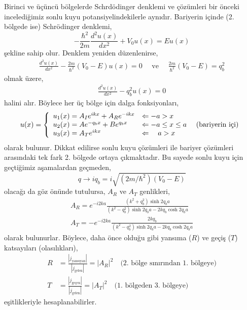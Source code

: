 \documentclass[a4paper,12pt, twoside]{article}
\begin{document}
Birinci ve üçüncü bölgelerde Schrdödinger denklemi ve çözümleri bir önceki incelediğimiz sonlu kuyu potansiyelindekilerle aynıdır. Bariyerin içinde (2. bölgede ise) Schrödinger denklemi, 
\begin{equation}
- \frac { \hbar ^ { 2 } } { 2 m } \frac { d ^ { 2 } u ( x ) } { d x ^ { 2 } } + V_0 u ( x ) = E u ( x )
\end{equation}
şekline sahip olur. Denklem yeniden düzenlenirse, 
\begin{align}
\frac { d ^ { 2 } u ( x ) } { d x ^ { 2 } } -  \frac { 2 m} { \hbar ^ { 2 } }  \left(V _ { 0 }-E \right) u ( x ) = 0 \quad \text{ ve } \quad \frac { 2 m} { \hbar ^ { 2 } }  \left(V _ { 0 } - E \right) = q_b ^ { 2 }
\end{align}
olmak üzere, 
\begin{align}
\frac { d ^ { 2 } u ( x ) } { d x ^ { 2 } } -  q_b^2 u ( x ) = 0
\end{align}
halini alır. Böylece her üç bölge için dalga fonksiyonları,
\begin{align}
u ( x )  = \left\{ 
\begin{array} { l l } 
{u_1(x) = A_I e^{i k x} + A_R e^{-i k x} } & {\Leftarrow -a > x } \\
{u_2(x) = A e^{- q_b x} + B e^{q_b x} } & {\Leftarrow -a \leq x \leq a } \quad \text{ (bariyerin içi)} \\
{u_3(x) = A_T e^{i k x}} & {\Leftarrow \quad a > x }
\end{array} \right. 
\end{align}
olarak bulunur. Dikkat edilirse sonlu kuyu çözümleri ile bariyer çözümleri arasındaki tek fark 2. bölgede ortaya çıkmaktadır. Bu sayede sonlu kuyu için geçtiğimiz aşamalardan geçmeden,
\begin{equation}
q \rightarrow i q_b = i \sqrt{\left(2 m / \hbar^{2}\right)\left(V_{0}-E\right)}
\end{equation}
olacağı da göz önünde tutulursa, $A_R$ ve $A_T$ genlikleri,
\begin{align}
{A_R= e^{-i 2 k a} \frac{\left(k^{2}+q_b^{2}\right) \sinh 2 q_b a}{\left(k^{2}-q_b^{2}\right) \sinh 2 q_b a - 2 k q_b \cosh 2 q_b a}} \\ 
{A_T= -e^{-i 2 k a} \frac{2 k q_b}{\left(k^{2}-q_b^{2}\right) \sinh 2 q_b a - 2 k q_b \cosh 2 q_b a}}
\end{align}
olarak bulunurlar. Böylece, daha önce olduğu gibi yansıma ($R$) ve geçiş ($T$) katsayıları (olasılıkları),
\begin{align}
R &= \frac{|j_\text{yansıyan}|}{|j_\text{gelen}|} = |A_R|^2 \quad \text{(2. bölge sınırından 1. bölgeye)}\\
T &= \frac{|j_\text{geçen}|}{|j_\text{gelen}|} = |A_T|^2  \quad \text{(1. bölgeden 3. bölgeye)}
\end{align}
eşitlikleriyle hesaplanabilirler.
\end{document}

